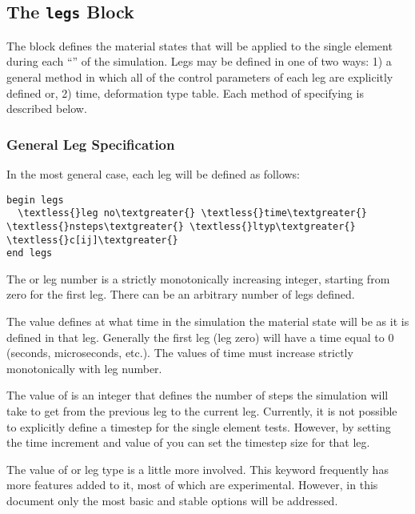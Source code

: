 \documentclass[letterpaper,10pt,english]{sphinxmanual}
\begin{document}
\subsection{The \texttt{legs} Block}
\label{Files/input_file_formatting:legs-block}\label{Files/input_file_formatting:the-legs-block}
The  block defines the material states that will be applied to the
single element during each ``'' of the simulation. Legs may be defined in
one of two ways: 1) a general method in which all of the control parameters of
each leg are explicitly defined or, 2) time, deformation type table. Each method
of specifying  is described below.


\subsubsection{General Leg Specification}
\label{Files/input_file_formatting:general-leg-specification}
In the most general case, each leg will be defined as follows:

\begin{Verbatim}[commandchars=\\\{\}]
begin legs
  \textless{}leg no\textgreater{} \textless{}time\textgreater{} \textless{}nsteps\textgreater{} \textless{}ltyp\textgreater{}  \textless{}c[ij]\textgreater{}
end legs
\end{Verbatim}

The  or leg number is a strictly monotonically increasing integer,
starting from zero for the first leg. There can be an arbitrary number of legs
defined.

The value  defines at what time in the simulation the material state will
be as it is defined in that leg. Generally the first leg (leg zero) will have a
time equal to 0 (seconds, microseconds, etc.). The values of time must increase
strictly monotonically with leg number.

The value of  is an integer that defines the number of steps the
simulation will take to get from the previous leg to the current leg. Currently,
it is not possible to explicitly define a timestep for the single element tests.
However, by setting the time increment and value of  you can set the
timestep size for that leg.

The value of  or leg type is a little more involved. This keyword
frequently has more features added to it, most of which are experimental.
However, in this document only the most basic and stable options will be
addressed.
\end{document}
